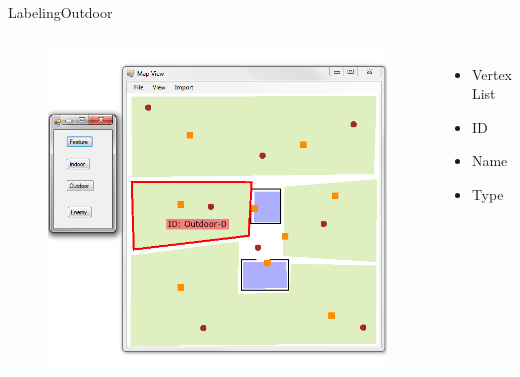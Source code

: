 \begin{frame}{Labeling}{Outdoor}

\begin{columns}
\begin{figure}
\centering
\includegraphics[width = \textwidth]{./screenshot/outdoor_label.png}
\end{figure}

\begin{minipage}{\textwidth}
\begin{itemize}
\item Vertex List
\item ID
\item Name
\item Type
\end{itemize}
\end{minipage}
\end{columns}

\end{frame}

